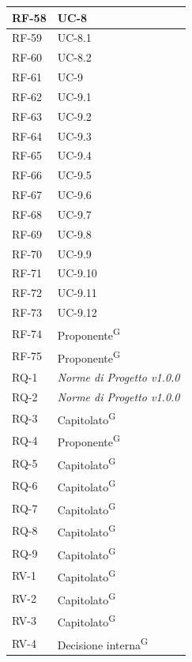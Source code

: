 \documentclass[8pt]{article}
\newcommand{\glossterm}[1]{#1\textsuperscript{G}} %
\begin{document}
\begin{longtable}{|>{\centering\arraybackslash}p{4cm}|>{\centering\arraybackslash}p{4cm}|}
            RF-58 & UC-8 \\ \hline
            RF-59 & UC-8.1 \\ \hline
            RF-60 & UC-8.2 \\ \hline
            RF-61 & UC-9 \\ \hline
            RF-62 & UC-9.1 \\ \hline
            RF-63 & UC-9.2 \\ \hline
            RF-64 & UC-9.3 \\ \hline
            RF-65 & UC-9.4 \\ \hline
            RF-66 & UC-9.5 \\ \hline
            RF-67 & UC-9.6 \\ \hline
            RF-68 & UC-9.7 \\ \hline
            RF-69 & UC-9.8 \\ \hline
            RF-70 & UC-9.9 \\ \hline
            RF-71 & UC-9.10 \\ \hline
            RF-72 & UC-9.11 \\ \hline
            RF-73 & UC-9.12 \\ \hline
            RF-74 & \glossterm{Proponente} \\ \hline
            RF-75 & \glossterm{Proponente} \\ \hline
            RQ-1 & \textit{Norme di Progetto v1.0.0} \\ \hline
            RQ-2 & \textit{Norme di Progetto v1.0.0} \\ \hline
            RQ-3 & \glossterm{Capitolato} \\ \hline
            RQ-4 & \glossterm{Proponente} \\ \hline
            RQ-5 & \glossterm{Capitolato} \\ \hline
            RQ-6 & \glossterm{Capitolato} \\ \hline
            RQ-7 & \glossterm{Capitolato} \\ \hline
            RQ-8 & \glossterm{Capitolato} \\ \hline
            RQ-9 & \glossterm{Capitolato} \\ \hline
            RV-1 & \glossterm{Capitolato} \\ \hline
            RV-2 & \glossterm{Capitolato} \\ \hline
            RV-3 & \glossterm{Capitolato} \\ \hline
            RV-4 & \glossterm{Decisione interna} \\ \hline

\end{longtable}
\end{document}
